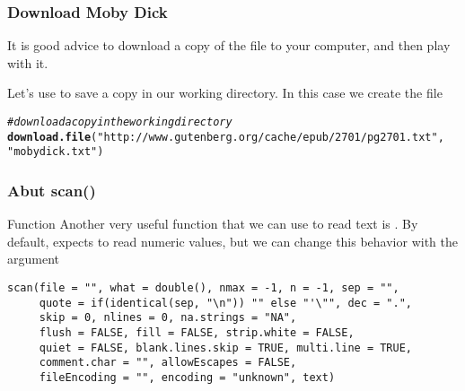 \documentclass[12pt]{beamer}\usepackage[]{graphicx}\usepackage[]{color}
\makeatletter
\newcommand{\hlstr}[1]{\textcolor[rgb]{0.192,0.494,0.8}{#1}}%
\newcommand{\hlcom}[1]{\textcolor[rgb]{0.678,0.584,0.686}{\textit{#1}}}%
\newcommand{\hlstd}[1]{\textcolor[rgb]{0.345,0.345,0.345}{#1}}%
\newcommand{\hlkwd}[1]{\textcolor[rgb]{0.737,0.353,0.396}{\textbf{#1}}}%
\newenvironment{kframe}{%
 \def\at@end@of@kframe{}%
 \ifinner\ifhmode%
  \def\at@end@of@kframe{\end{minipage}}%
  \begin{minipage}{\columnwidth}%
 \fi\fi%
 \def\FrameCommand##1{\hskip\@totalleftmargin \hskip-\fboxsep
 \colorbox{shadecolor}{##1}\hskip-\fboxsep
     \hskip-\linewidth \hskip-\@totalleftmargin \hskip\columnwidth}%
 \MakeFramed {\advance\hsize-\width
   \@totalleftmargin\z@ \linewidth\hsize
   \@setminipage}}%
 {\par\unskip\endMakeFramed%
 \at@end@of@kframe}
\newenvironment{knitrout}{}{} %
\makeatother
\begin{document}
\begin{frame}[fragile]
\frametitle{Download Moby Dick}

It is good advice to download a copy of the file to your computer, and then play with it. 

\bigskip

Let's use {\hilit {}} to save a copy in our working directory. In this case we create the file 

\begin{knitrout}\scriptsize
{}\color{fgcolor}\begin{kframe}
\begin{alltt}
\hlcom{# download a copy in the working directory}
\hlkwd{download.file}\hlstd{(}\hlstr{"http://www.gutenberg.org/cache/epub/2701/pg2701.txt"}\hlstd{,}
              \hlstr{"mobydick.txt"}\hlstd{)}
\end{alltt}
\end{kframe}
\end{knitrout}
\eb

\end{frame}


\begin{frame}[fragile]
\frametitle{Abut scan()}

\begin{block}{Function }
Another very useful function that we can use to read text is {\hilit {}}. By default,  expects to read numeric values, but we can change this behavior with the argument 

{\footnotesize
\begin{verbatim}
scan(file = "", what = double(), nmax = -1, n = -1, sep = "",
     quote = if(identical(sep, "\n")) "" else "'\"", dec = ".",
     skip = 0, nlines = 0, na.strings = "NA",
     flush = FALSE, fill = FALSE, strip.white = FALSE,
     quiet = FALSE, blank.lines.skip = TRUE, multi.line = TRUE,
     comment.char = "", allowEscapes = FALSE,
     fileEncoding = "", encoding = "unknown", text)
 \end{verbatim}
}

\end{block}

\end{frame}

\end{document}
